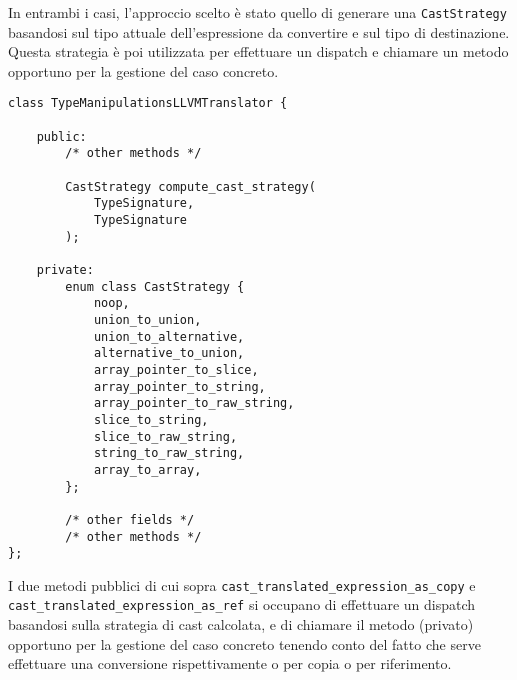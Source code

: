 In entrambi i casi, l'approccio scelto è stato quello di generare una \texttt{CastStrategy} basandosi sul tipo attuale dell'espressione da 
convertire e sul tipo di destinazione. Questa strategia è poi utilizzata per effettuare un dispatch e chiamare un metodo opportuno per la gestione 
del caso concreto. \\

\vspace{0.5cm}
\begin{lstlisting}[frame=single]
class TypeManipulationsLLVMTranslator {

    public:
        /* other methods */
        
        CastStrategy compute_cast_strategy(
            TypeSignature,
            TypeSignature
        );

    private:
        enum class CastStrategy {
            noop,
            union_to_union,
            union_to_alternative,
            alternative_to_union,
            array_pointer_to_slice,
            array_pointer_to_string,
            array_pointer_to_raw_string,
            slice_to_string,
            slice_to_raw_string,
            string_to_raw_string,
            array_to_array,
        };

        /* other fields */
        /* other methods */
};
\end{lstlisting}
\vspace{0.5cm}

I due metodi pubblici di cui sopra \texttt{cast\_translated\_expression\_as\_copy} e \texttt{cast\_translated\_expression\_as\_ref} si occupano di
effettuare un dispatch basandosi sulla strategia di cast calcolata, e di chiamare il metodo (privato) opportuno per la gestione del caso concreto
tenendo conto del fatto che serve effettuare una conversione rispettivamente o per copia o per riferimento. \\